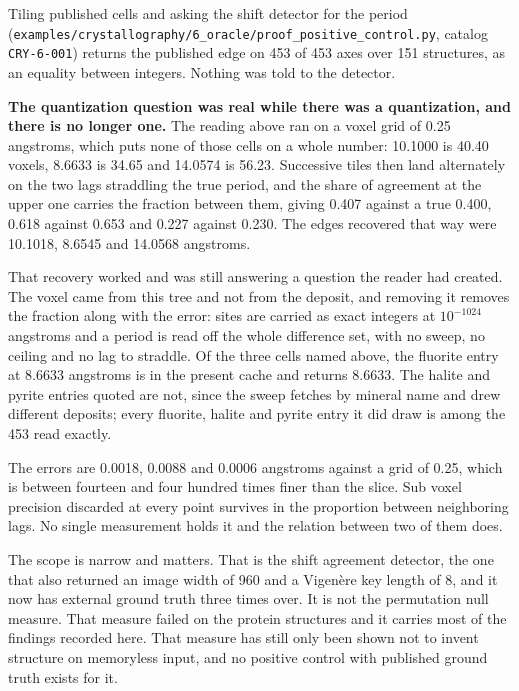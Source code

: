 Tiling published cells and asking the shift detector for the period (\texttt{examples/\allowbreak{}crystallography/\allowbreak{}6\_\allowbreak{}oracle/\allowbreak{}proof\_\allowbreak{}positive\_\allowbreak{}control.\allowbreak{}py}, catalog \texttt{CRY-6-001}) returns the published edge on 453 of 453 axes over 151 structures, as an equality between integers. Nothing was told to the detector.

\textbf{The quantization question was real while there was a quantization, and there is no longer one.} The reading above ran on a voxel grid of 0.25 angstroms, which puts none of those cells on a whole number: 10.1000 is 40.40 voxels, 8.6633 is 34.65 and 14.0574 is 56.23. Successive tiles then land alternately on the two lags straddling the true period, and the share of agreement at the upper one carries the fraction between them, giving 0.407 against a true 0.400, 0.618 against 0.653 and 0.227 against 0.230. The edges recovered that way were 10.1018, 8.6545 and 14.0568 angstroms.

That recovery worked and was still answering a question the reader had created. The voxel came from this tree and not from the deposit, and removing it removes the fraction along with the error: sites are carried as exact integers at $10^{-1024}$ angstroms and a period is read off the whole difference set, with no sweep, no ceiling and no lag to straddle. Of the three cells named above, the fluorite entry at 8.6633 angstroms is in the present cache and returns 8.6633. The halite and pyrite entries quoted are not, since the sweep fetches by mineral name and drew different deposits; every fluorite, halite and pyrite entry it did draw is among the 453 read exactly.

The errors are 0.0018, 0.0088 and 0.0006 angstroms against a grid of 0.25, which is between fourteen and four hundred times finer than the slice. Sub voxel precision discarded at every point survives in the proportion between neighboring lags. No single measurement holds it and the relation between two of them does.

The scope is narrow and matters. That is the shift agreement detector, the one that also returned an image width of 960 and a Vigenère key length of 8, and it now has external ground truth three times over. It is not the permutation null measure. That measure failed on the protein structures and it carries most of the findings recorded here. That measure has still only been shown not to invent structure on memoryless input, and no positive control with published ground truth exists for it.

